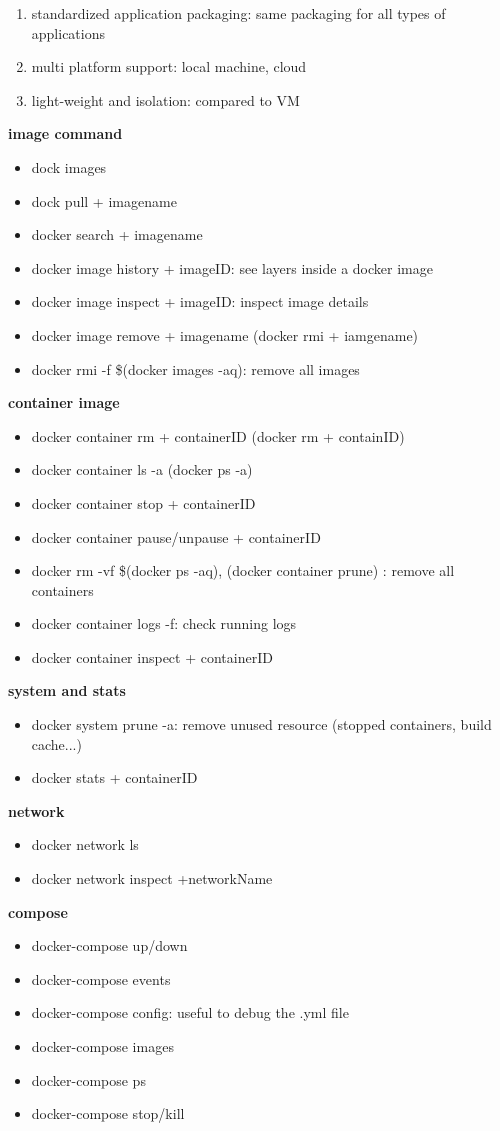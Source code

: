 \documentclass{article}
\begin{document}
\begin{itemize}
\begin{enumerate}
\item standardized application packaging: same packaging for all types of applications
\item multi platform support: local machine, cloud
\item light-weight and isolation: compared to VM
\end{enumerate}
\textbf{image command}
\begin{itemize}
\item dock images
\item dock pull + imagename
\item docker search + imagename
\item docker image history + imageID: see layers inside a docker image
\item docker image inspect + imageID: inspect image details
\item docker image remove + imagename (docker rmi + iamgename)
\item docker rmi -f \$(docker images -aq): remove all images
\end{itemize}
\textbf{container image}
\begin{itemize}
\item docker container rm + containerID (docker rm + containID)
\item docker container ls -a (docker ps -a)
\item docker container stop + containerID
\item docker container pause/unpause + containerID
\item docker rm -vf \$(docker ps -aq), (docker container prune) : remove all containers
\item docker container logs -f: check running logs
\item docker container inspect + containerID
\end{itemize}
\textbf{system and stats}
\begin{itemize}
\item docker system prune -a: remove unused resource (stopped containers, build cache...)
\item docker stats + containerID
\end{itemize}
\textbf{network}
\begin{itemize}
\item docker network ls
\item docker network inspect +networkName
\end{itemize}
\textbf{compose}
\begin{itemize}
\item docker-compose up/down
\item docker-compose events
\item docker-compose config: useful to debug the .yml file
\item docker-compose images
\item docker-compose ps
\item docker-compose stop/kill
\end{itemize}


\end{itemize}
\end{document}
